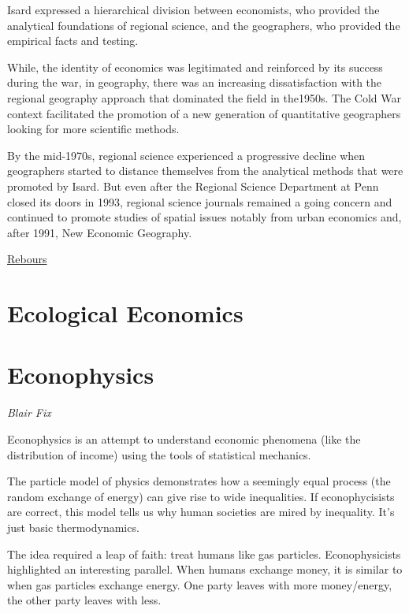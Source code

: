 \documentclass[
]{book}
\begin{document}
Isard expressed a hierarchical division between economists, who provided
the analytical foundations of regional science,
and the geographers, who provided the empirical facts and testing.

While, the identity of economics was legitimated and reinforced by its success during the war, in geography, there was an increasing dissatisfaction with the regional geography approach that dominated the field in the1950s. The Cold War context facilitated the promotion of a new generation of quantitative geographers looking for more scientific methods.

By the mid-1970s, regional science experienced a progressive decline when geographers started to distance themselves from the analytical methods that were promoted by Isard. But even after the Regional Science Department at Penn closed its doors in 1993, regional science journals remained a going concern and continued to promote studies of spatial issues notably from urban economics and, after 1991, New Economic Geography.

\href{https://hscif.org/economists-in-the-city-rebours/}{Rebours}

\hypertarget{ecological-economics}{%
\chapter{Ecological Economics}\label{ecological-economics}}

\hypertarget{econophysics}{%
\chapter{Econophysics}\label{econophysics}}

\emph{Blair Fix}

Econophysics is an attempt to understand economic phenomena
(like the distribution of income)
using the tools of statistical mechanics.

The particle model of physics demonstrates how a seemingly equal process
(the random exchange of energy)
can give rise to wide inequalities.
If econophycisists are correct,
this model tells us why human societies are mired by inequality.
It's just basic thermodynamics.

The idea required a leap of faith: treat humans like gas particles.
Econophysicists highlighted an interesting parallel.
When humans exchange money, it is similar to when gas particles exchange energy.
One party leaves with more money/energy, the other party leaves with less.
\end{document}
